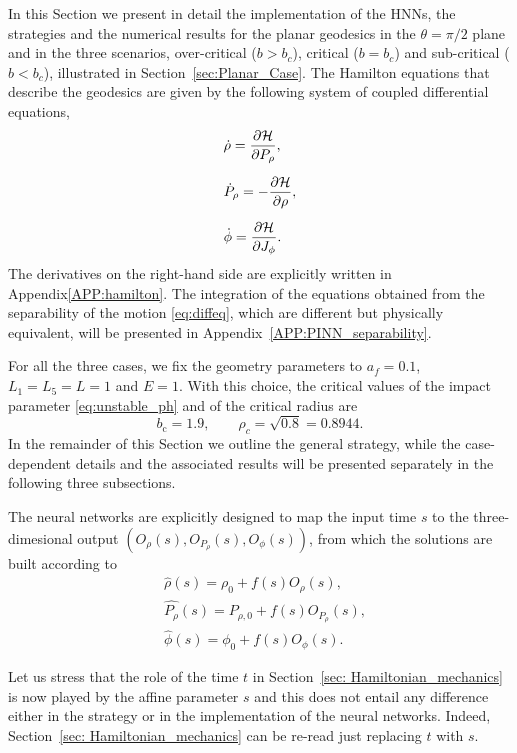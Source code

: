 \documentclass[prd,aps,a4paper,eqsecnum,nofootinbib,floatfix,twocolumn,superscriptaddress]{revtex4-2}
\begin{document}
In this Section we present in detail the implementation of the HNNs, the strategies and the numerical results for the planar geodesics in the $\theta=\pi/2$ plane and in the three scenarios, over-critical ($b>b_c$), critical ($b=b_c$) and sub-critical ($b<b_c$), illustrated in Section~\ref{sec:Planar_Case}. The Hamilton equations that describe the geodesics are given by the following system of coupled differential equations,
\begin{align}
   &\dot \rho = \pdv{\mathcal{H}}{P_\rho},
   \nonumber\\[6pt]
   &\dot P_\rho  =-\pdv{\mathcal{H}}{\rho},
   \nonumber\\[6pt]
   &\dot \phi = \pdv{\mathcal{H}}{J_\phi}.
\end{align}
The derivatives on the right-hand side are explicitly written in Appendix\ref{APP:hamilton}. The integration of the equations obtained from the separability of the motion \eqref{eq:diffeq}, which are different but physically equivalent, will be presented in Appendix~\ref{APP:PINN_separability}.




For all the three cases,  we fix the geometry parameters to $a_f=0.1$, $L_1=L_5=L=1$ and $E=1$. With this choice, the critical values of the impact parameter \eqref{eq:unstable_ph} and of the critical radius are
\begin{equation}\label{eq:planar_crit_params_values}
  b_\mathrm{c}=1.9, \qquad \rho_c = \sqrt{0.8} = 0.8944.
\end{equation}
In the remainder of this Section we outline the general strategy, while the case-dependent details and the associated results will be presented separately in the following three subsections.

The neural networks are explicitly designed to map the input time $s$ to the three-dimesional output $(O_\rho(s),O_{P_\rho}(s),O_\phi(s))$, from which the solutions are built according to 
\begin{align}
& \widehat{\rho}(s) = \rho_0  +f(s)O_\rho(s),
\nonumber\\[6pt]
& \widehat{P_\rho}(s) = P_{\rho,0}+f(s)O_{P_\rho}(s),
\nonumber\\[6pt]
& \widehat{\phi}(s) = \phi_0 +f(s)O_{\phi}(s).
\end{align}

 Let us stress that the role of the time $t$ in Section~\ref{sec: Hamiltonian_mechanics} is now played by the affine parameter $s$ and this  does not entail any difference either in the strategy or in the implementation of the neural networks. Indeed, Section~\ref{sec: Hamiltonian_mechanics} can be re-read just replacing $t$ with $s$.
 
\end{document}
